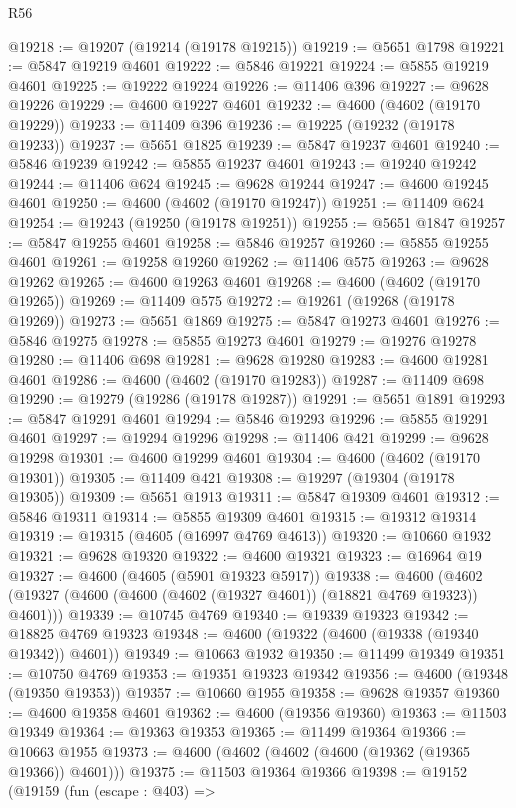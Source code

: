 \begin{lexlean}{R56}
\begin{coremodule}
@19218 := @19207 (@19214 (@19178 @19215))
@19219 := @5651 @1798
@19221 := @5847 @19219 @4601
@19222 := @5846 @19221
@19224 := @5855 @19219 @4601
@19225 := @19222 @19224
@19226 := @11406 @396
@19227 := @9628 @19226
@19229 := @4600 @19227 @4601
@19232 := @4600 (@4602 (@19170 @19229))
@19233 := @11409 @396
@19236 := @19225 (@19232 (@19178 @19233))
@19237 := @5651 @1825
@19239 := @5847 @19237 @4601
@19240 := @5846 @19239
@19242 := @5855 @19237 @4601
@19243 := @19240 @19242
@19244 := @11406 @624
@19245 := @9628 @19244
@19247 := @4600 @19245 @4601
@19250 := @4600 (@4602 (@19170 @19247))
@19251 := @11409 @624
@19254 := @19243 (@19250 (@19178 @19251))
@19255 := @5651 @1847
@19257 := @5847 @19255 @4601
@19258 := @5846 @19257
@19260 := @5855 @19255 @4601
@19261 := @19258 @19260
@19262 := @11406 @575
@19263 := @9628 @19262
@19265 := @4600 @19263 @4601
@19268 := @4600 (@4602 (@19170 @19265))
@19269 := @11409 @575
@19272 := @19261 (@19268 (@19178 @19269))
@19273 := @5651 @1869
@19275 := @5847 @19273 @4601
@19276 := @5846 @19275
@19278 := @5855 @19273 @4601
@19279 := @19276 @19278
@19280 := @11406 @698
@19281 := @9628 @19280
@19283 := @4600 @19281 @4601
@19286 := @4600 (@4602 (@19170 @19283))
@19287 := @11409 @698
@19290 := @19279 (@19286 (@19178 @19287))
@19291 := @5651 @1891
@19293 := @5847 @19291 @4601
@19294 := @5846 @19293
@19296 := @5855 @19291 @4601
@19297 := @19294 @19296
@19298 := @11406 @421
@19299 := @9628 @19298
@19301 := @4600 @19299 @4601
@19304 := @4600 (@4602 (@19170 @19301))
@19305 := @11409 @421
@19308 := @19297 (@19304 (@19178 @19305))
@19309 := @5651 @1913
@19311 := @5847 @19309 @4601
@19312 := @5846 @19311
@19314 := @5855 @19309 @4601
@19315 := @19312 @19314
@19319 := @19315 (@4605 (@16997 @4769 @4613))
@19320 := @10660 @1932
@19321 := @9628 @19320
@19322 := @4600 @19321
@19323 := @16964 @19
@19327 := @4600 (@4605 (@5901 @19323 @5917))
@19338 := @4600 (@4602 (@19327 (@4600 (@4600 (@4602 (@19327 @4601)) (@18821 @4769 @19323)) @4601)))
@19339 := @10745 @4769
@19340 := @19339 @19323
@19342 := @18825 @4769 @19323
@19348 := @4600 (@19322 (@4600 (@19338 (@19340 @19342)) @4601))
@19349 := @10663 @1932
@19350 := @11499 @19349
@19351 := @10750 @4769
@19353 := @19351 @19323 @19342
@19356 := @4600 (@19348 (@19350 @19353))
@19357 := @10660 @1955
@19358 := @9628 @19357
@19360 := @4600 @19358 @4601
@19362 := @4600 (@19356 @19360)
@19363 := @11503 @19349
@19364 := @19363 @19353
@19365 := @11499 @19364
@19366 := @10663 @1955
@19373 := @4600 (@4602 (@4602 (@4600 (@19362 (@19365 @19366)) @4601)))
@19375 := @11503 @19364 @19366
@19398 := @19152
    (@19159
      (fun (escape : @403) =>

\end{coremodule}
\end{lexlean}
